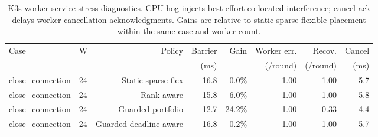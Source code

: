 \begin{table}[t]
  \centering
  \scriptsize
  \setlength{\tabcolsep}{3pt}
  \caption{K3s worker-service stress diagnostics. CPU-hog injects best-effort co-located interference; cancel-ack delays worker cancellation acknowledgments. Gains are relative to static sparse-flexible placement within the same case and worker count.}
  \label{tab:k8s-stress}
  \begin{tabular}{@{}llrrrrrr@{}}
    \toprule
    Case & W & Policy & Barrier & Gain & Worker err. & Recov. & Cancel \\
         &   &        & (ms) &      & (/round) & (/round) & (ms) \\
    \midrule
    close\_connection & 24 & Static sparse-flex & 16.8 & 0.0\% & 1.00 & 1.00 & 5.7 \\
    close\_connection & 24 & Rank-aware & 15.8 & 6.0\% & 1.00 & 1.00 & 5.8 \\
    close\_connection & 24 & Guarded portfolio & 12.7 & 24.2\% & 1.00 & 0.33 & 4.4 \\
    close\_connection & 24 & Guarded deadline-aware & 16.8 & 0.2\% & 1.00 & 1.00 & 5.7 \\
    \bottomrule
  \end{tabular}
\end{table}
